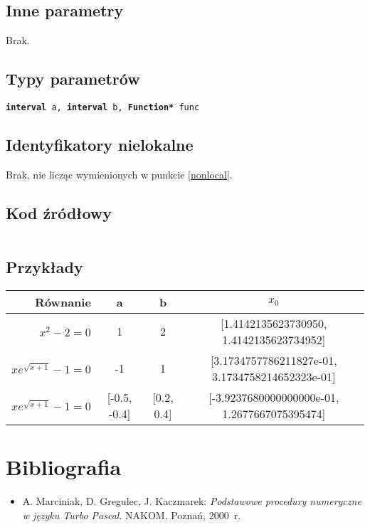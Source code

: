 \documentclass[12pt]{article}
\begin{document}
		\subsection{Inne parametry}
      Brak. 

		\subsection{Typy parametrów}
      \texttt{\textbf{interval} a, \textbf{interval} b, \textbf{Function*} func}

		\subsection{Identyfikatory nielokalne}
      Brak, nie licząc wymienionych w punkcie \ref{nonlocal}.

		\subsection{Kod źródłowy}
			\inputminted[firstline=6, lastline=35]{c++}{../solvers/secant.cpp}

		\subsection{Przykłady}
			\begin{tabular}{|r|c|c||c|}
				\hline
				Równanie & a & b & $x_0$ \\\hline

				$x^2 - 2 = 0$ & 1 & 2 & [1.4142135623730950, 1.4142135623734952]\\\hline
				$xe^{\sqrt{x+1}} - 1 = 0$ & -1 & 1 & [3.1734757786211827e-01, 3.1734758214652323e-01]\\\hline
				$xe^{\sqrt{x+1}} - 1 = 0$ & [-0.5, -0.4] & [0.2, 0.4] & [-3.9237680000000000e-01, 1.2677667075395474]\\\hline

			\end{tabular}

	\section{Bibliografia}
		\begin{itemize}
		  \item A. Marciniak, D. Gregulec, J. Kaczmarek: \textsl{Podstawowe procedury numeryczne w języku Turbo Pascal}. NAKOM, Poznań, 2000~r.
		\end{itemize}
\end{document}
